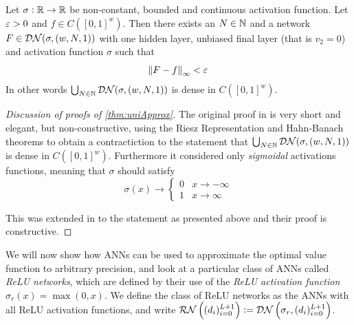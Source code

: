 \begin{thm}
  Let $\sigma: \mathbb{R} \to \mathbb{R}$ be non-constant, bounded and continuous
  activation function.
  Let $\varepsilon > 0$ and $f \in C([0,1]^w)$.
  Then there exists an $N \in \mathbb{N}$ and a network
  $F \in \mathcal{DN}(\sigma, (w, N, 1))$
  with one hidden layer,
  unbiased final layer (that is $v_2 = 0$)
  and activation function $\sigma$ such that
  \[ \norm{F - f}_\infty < \varepsilon \]
  In other words $\bigcup_{N \in \mathbb{N}} \mathcal{DN}(\sigma, (w, N, 1))$ is
  dense in $C([0,1]^w)$.
  \label{thm:uniApprox}
\end{thm}
\begin{proof}[Discussion of proofs of \cref{thm:uniApprox}]
  The original proof in  is very short and elegant,
  but non-constructive,
  using the Riesz Representation and Hahn-Banach theorems to
  obtain a contractiction to the statement that
  $\bigcup_{N \in \mathbb{N}} \mathcal{DN}(\sigma, (w,N,1))$
  is dense in $C([0,1]^w)$.
  Furthermore it considered only \emph{sigmoidal} activations
  functions, meaning that $\sigma$ should satisfy
  \[ \sigma(x) \to \begin{cases} 0 & x \to -\infty
  \\ 1 & x \to \infty \end{cases} \]
  
  This was extended in  to the statement as presented above
  and their proof is constructive. 
\end{proof}

We will now show how ANNs can be used to approximate the optimal
value function to arbitrary precision,
and look at a particular class of ANNs called \emph{ReLU networks},
which are defined by their use of the \emph{ReLU activation function}
$\sigma_r(x) = \max(0, x)$.
We define the class of ReLU networks as the ANNs
with all ReLU activation functions, and write
$\mathcal{RN}\left( (d_i)_{i=0}^{L+1} \right)
\vcentcolon= \mathcal{DN}\left( \sigma_r, (d_i)_{i=0}^{L+1} \right)$.

